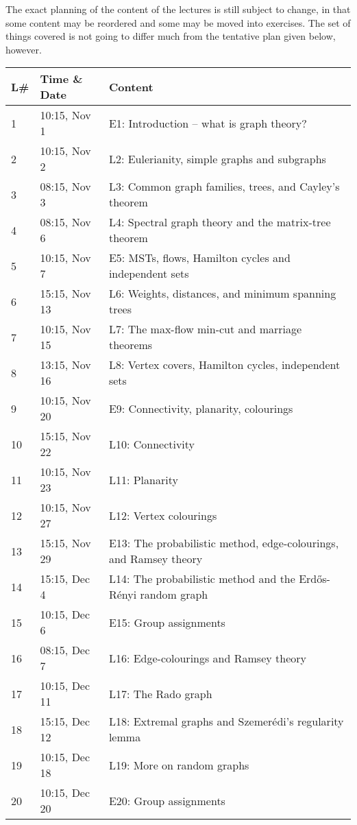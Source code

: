 \documentclass{tufte-handout}
\begin{document}
The exact planning of the content of the lectures is still subject to change, in that some content may be reordered and some may be moved into exercises. The set of things covered is not going to differ much from the tentative plan given below, however.

\begin{table}[h]
\begin{tabularx}{\textwidth}{llX}
L\# & Time \& Date      & Content \\ 
\midrule
1  & 10:15, Nov 1 & E1: Introduction -- what is graph theory?\\
2  & 10:15, Nov 2 & L2: Eulerianity, simple graphs and subgraphs\\
3  & 08:15, Nov 3 & L3: Common graph families, trees, and Cayley's theorem\\
4  & 08:15, Nov 6 & L4: Spectral graph theory and the matrix-tree theorem\\
5  & 10:15, Nov 7 & E5: MSTs, flows, Hamilton cycles and independent sets\\
6  & 15:15, Nov 13 & L6: Weights, distances, and minimum spanning trees\\
7  & 10:15, Nov 15 & L7: The max-flow min-cut and marriage theorems\\
8  & 13:15, Nov 16 & L8: Vertex covers, Hamilton cycles, independent sets\\
9  & 10:15, Nov 20 & E9: Connectivity, planarity, colourings\\
10 & 15:15, Nov 22 & L10: Connectivity\\
11 & 10:15, Nov 23 & L11: Planarity\\
12 & 10:15, Nov 27 & L12: Vertex colourings\\
13 & 15:15, Nov 29 & E13: The probabilistic method, edge-colourings, and Ramsey theory\\
14 & 15:15, Dec 4 & L14: The probabilistic method and the Erd\H{o}s-Rényi random graph\\
15 & 10:15, Dec 6 & E15: Group assignments\\
16 & 08:15, Dec 7 & L16: Edge-colourings and Ramsey theory\\
17 & 10:15, Dec 11 & L17: The Rado graph\\
18 & 15:15, Dec 12 & L18: Extremal graphs and Szemerédi's regularity lemma\\
19 & 10:15, Dec 18 & L19: More on random graphs\\
20 & 10:15, Dec 20 & E20: Group assignments
\end{tabularx}
\end{table}
\end{document}
